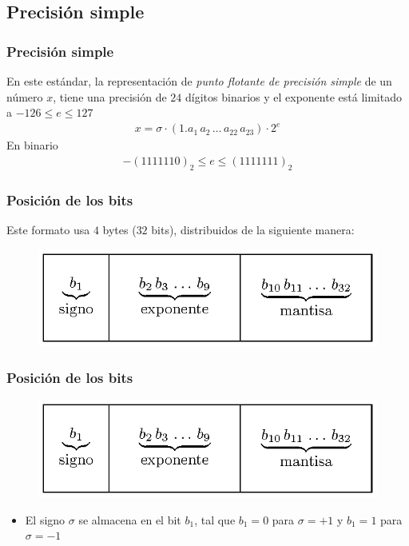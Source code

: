 \subsection{Precisión simple}
\begin{frame}
\frametitle{Precisión simple}
En este estándar, la representación de \emph{punto flotante de precisión simple} de un número $x$, tiene una precisión de $24$ dígitos binarios y el exponente está limitado a $-126 \leq e \leq 127$
\begin{align*}
x = \sigma \cdot (1.a_{1} \, a_{2} \, \ldots \, a_{22} \, a_{23}) \cdot 2^{e}
\end{align*}
En binario
\begin{align*}
-(1111110)_{2} \leq e \leq (1111111)_{2}
\end{align*}
\end{frame}
\begin{frame}
\frametitle{Posición de los bits}
Este formato usa $4$ bytes ($32$  bits), distribuidos de la siguiente manera:
\begin{figure}
    \centering
    \includegraphics[scale=1.2]{Imagenes/precision_simple.eps}
\end{figure}
\end{frame}
\begin{frame}
\frametitle{Posición de los bits}
\begin{figure}
    \centering
    \includegraphics[scale=1.2]{Imagenes/precision_simple.eps}
\end{figure}
\begin{itemize}[<+->]
\item El signo $\sigma$ se almacena en el bit $b_{1}$, tal que $b_{1} = 0$ para $\sigma = +1$ y $b_{1} = 1$ para $\sigma = -1$
\end{itemize}
\end{frame}
